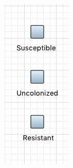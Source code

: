 \begin{figure}
\begin{subfigure}[b]{0.3\textwidth}
        \includegraphics[width=\textwidth]{img/screens/basic/basic4}

\end{subfigure}
\end{figure}
